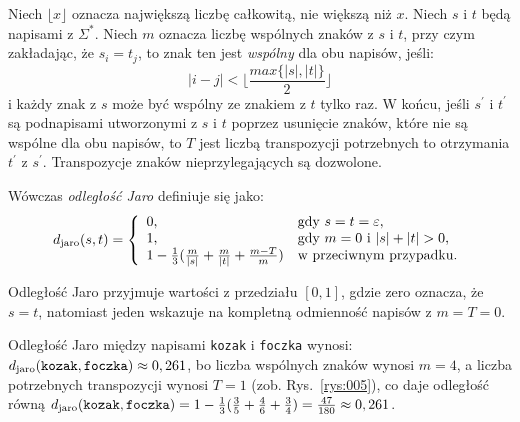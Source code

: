 \documentclass{praca1}
\begin{document}
\begin{definition}
Niech $\lfloor x \rfloor$ oznacza największą liczbę całkowitą, nie większą niż $x$. Niech $s$ i $t$ będą napisami z $\Sigma^*$. Niech $m$ oznacza liczbę wspólnych znaków z $s$ i $t$, przy czym zakładając, że $s_i = t_j$, to znak ten jest \emph{wspólny} dla obu napisów, jeśli:
\begin{equation*}
|i -j| < \Bigg\lfloor\frac{max\{|s|, |t|\}}{2}\Bigg\rfloor
\end{equation*}
i każdy znak z $s$ może być wspólny ze znakiem z $t$ tylko raz. W końcu, jeśli $s^\prime$ i $t^\prime$ są podnapisami utworzonymi z $s$ i $t$ poprzez usunięcie znaków, które nie są wspólne dla obu napisów, to $T$ jest liczbą transpozycji potrzebnych to otrzymania $t^\prime$ z $s^\prime$. Transpozycje znaków nieprzylegających są dozwolone.

Wówczas \emph{odległość Jaro} definiuje się jako:
\begin{equation}
\label{eq:011}
d_{\mathrm{jaro}}(s,t) = \left\{
\begin{array}{l l}     
    0, & \text{gdy } s = t = \varepsilon, \\
    1, & \text{gdy } m = 0 \text{ i } |s| + |t| > 0, \\
    1 - \frac{1}{3} (\frac{m}{|s|} + \frac{m}{|t|} + \frac{m - T}{m}) & \text{w przeciwnym przypadku}.
\end{array}\right.
\end{equation}
\end{definition}

Odległość Jaro przyjmuje wartości z przedziału $[0,1]$, gdzie zero oznacza, że $s = t$, natomiast jeden wskazuje na kompletną odmienność napisów z $m = T = 0$.

\begin{example}
Odległość Jaro między napisami \verb|kozak| i \verb|foczka| wynosi: $d_{\mathrm{jaro}}(\verb|kozak|, \verb|foczka|)  \approx 0,261$, bo liczba wspólnych znaków wynosi $m = 4$, a liczba potrzebnych transpozycji wynosi $T = 1$ (zob. Rys.~\ref{rys:005}), co daje odległość równą $d_{\mathrm{jaro}}(\verb|kozak|, \verb|foczka|) = 1 - \frac{1}{3}(\frac{3}{5} + \frac{4}{6} + \frac{3}{4}) = \frac{47}{180} \approx 0,261$.
\end{example}
\end{document}
